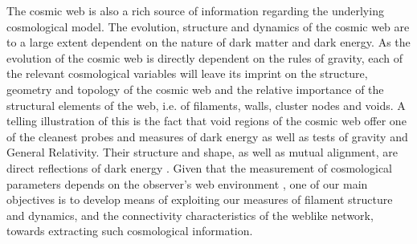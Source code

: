 \documentclass[useAMS,usenatbib]{mnras}
\begin{document}
The cosmic web is also a rich source of information regarding the underlying cosmological model. The evolution, structure and dynamics of the 
cosmic web are to a large extent dependent on the nature of dark matter and dark energy. As the evolution of the cosmic web 
is directly dependent on the rules of gravity, each of the relevant cosmological variables will leave its imprint on the 
structure, geometry and topology of the cosmic web and the relative importance of the structural elements of the 
web, i.e. of filaments, walls, cluster nodes and voids. A telling illustration of this is the fact that  void regions of the cosmic web offer one of the cleanest probes and measures of dark energy as well as tests of gravity and General Relativity. Their structure and shape, as well as mutual alignment, are direct 
reflections of dark energy \citep{parklee2007,platen2008,leepark2009,lavaux2010,lavaux2012,bos2012,2015MNRAS.446L...1S,pisani2015}. Given that the measurement of cosmological parameters depends on the observer's web environment \citep[e.g.][]{2014MNRAS.438.1805W}, one of our 
main objectives is to develop means of exploiting our measures of filament structure and dynamics, and the connectivity 
characteristics of the weblike network, towards extracting such cosmological information. 
\end{document}
